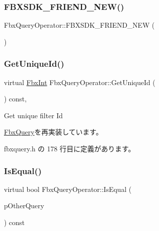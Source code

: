 \subsubsection{\texorpdfstring{F\+B\+X\+S\+D\+K\+\_\+\+F\+R\+I\+E\+N\+D\+\_\+\+N\+E\+W()}{FBXSDK\_FRIEND\_NEW()}}
{\footnotesize\ttfamily Fbx\+Query\+Operator\+::\+F\+B\+X\+S\+D\+K\+\_\+\+F\+R\+I\+E\+N\+D\+\_\+\+N\+EW (\begin{DoxyParamCaption}{ }\end{DoxyParamCaption})}

\mbox{\label{class_fbx_query_operator_a55d021e0103b5e7dc0f8a80e4b468314}} 
\subsubsection{\texorpdfstring{Get\+Unique\+Id()}{GetUniqueId()}}
{\footnotesize\ttfamily virtual \hyperlink{fbxtypes_8h_a088fa96de3b0b3ea69f0f6afef525dfb}{Fbx\+Int} Fbx\+Query\+Operator\+::\+Get\+Unique\+Id (\begin{DoxyParamCaption}{ }\end{DoxyParamCaption}) const\hspace{0.3cm}{\ttfamily [inline]}, {\ttfamily [virtual]}}



Get unique filter Id 



\hyperlink{class_fbx_query_ac7daae8f6fa83cd97ae24e93d7b4dc29}{Fbx\+Query}を再実装しています。



 fbxquery.\+h の 178 行目に定義があります。

\mbox{\label{class_fbx_query_operator_aa96734a4da59286a2cab2832f0529175}} 
\subsubsection{\texorpdfstring{Is\+Equal()}{IsEqual()}}
{\footnotesize\ttfamily virtual bool Fbx\+Query\+Operator\+::\+Is\+Equal (\begin{DoxyParamCaption}\item[{\hyperlink{class_fbx_query}{Fbx\+Query} $\ast$}]{p\+Other\+Query }\end{DoxyParamCaption}) const\hspace{0.3cm}{\ttfamily [virtual]}}

